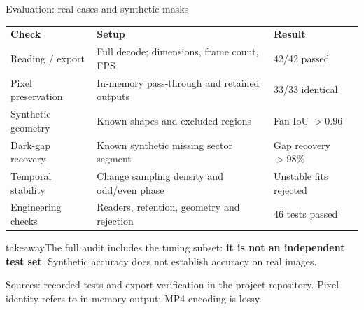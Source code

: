 \documentclass[aspectratio=169,10pt]{beamer}
\newcommand{\source}[1]{\par\vfill{\fontsize{6.1}{8}\selectfont\color{Muted}#1\par}}
\newcommand{\takeaway}[1]{\vspace{5pt}\begin{beamercolorbox}[wd=\linewidth,sep=6pt]{takeaway}\small #1\end{beamercolorbox}}
\renewcommand{\arraystretch}{1.25}
\begin{document}
\begin{frame}[t]{Evaluation: real cases and synthetic masks}
  \begin{center}
  \end{center}
  \small\renewcommand{\arraystretch}{1.15}
  \begin{tabularx}{\linewidth}{@{}l Y l@{}}
    \textbf{Check}&\textbf{Setup}&\textbf{Result}\\
    Reading / export&Full decode; dimensions, frame count, FPS&42/42 passed\\
    Pixel preservation&In-memory pass-through and retained outputs&33/33 identical\\
    Synthetic geometry&Known shapes and excluded regions&Fan IoU $>0.96$\\
    Dark-gap recovery&Known synthetic missing sector segment&Gap recovery $>98\%$\\
    Temporal stability&Change sampling density and odd/even phase&Unstable fits rejected\\
    Engineering checks&Readers, retention, geometry and rejection&46 tests passed\\
    \bottomrule
  \end{tabularx}
  \takeaway{The full audit includes the tuning subset: \textbf{it is not an independent test set}. Synthetic accuracy does not establish accuracy on real images.}
  \source{Sources: recorded tests and export verification in the project repository. Pixel identity refers to in-memory output; MP4 encoding is lossy.}
\end{frame}
\end{document}
